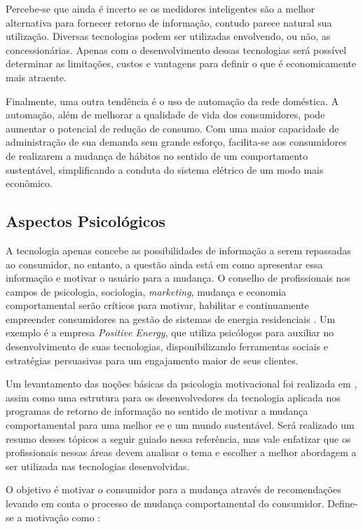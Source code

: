 Percebe-se que ainda é incerto se os medidores inteligentes são a melhor 
alternativa para fornecer retorno de informação, contudo parece natural sua 
utilização. Diversas tecnologias podem ser utilizadas envolvendo, ou não, as 
concessionárias. Apenas com o desenvolvimento dessas tecnologias será
possível determinar as limitações, custos e vantagens para definir o que é 
economicamente mais atraente.

Finalmente, uma outra tendência é o uso de automação da rede doméstica. A
automação, além de melhorar a qualidade de vida dos consumidores, pode aumentar
o potencial de redução de consumo. Com uma maior capacidade de administração de
sua demanda sem grande esforço, facilita-se aos consumidores de realizarem a
mudança de hábitos no sentido de um comportamento sustentável, simplificando
a conduta do sistema elétrico de um modo mais econômico.

\subsection{Aspectos Psicológicos}
\label{ssec:asp_psic}

A tecnologia apenas concebe as possibilidades de informação a
serem repassadas ao consumidor, no entanto, a questão ainda está em como
apresentar essa informação e motivar o usuário para a mudança. 
O conselho de profissionais nos campos de psicologia, sociologia,
\emph{marketing}, mudança e economia comportamental serão críticos para
motivar, habilitar e continuamente empreender consumidores na gestão de sistemas 
de energia residenciais \cite{aceee_2010_estudos_feedback}. 
Um exemplo é a empresa \emph{Positive Energy}, que utiliza psicólogos para
auxiliar no desenvolvimento de suas tecnologias, disponibilizando ferramentas
sociais e estratégias persuasivas para um engajamento maior de seus clientes.

Um levantamento das noções básicas da psicologia motivacional foi realizada em
\cite{2010_aspectos_psicologicos_usa}, assim como uma estrutura para os desenvolvedores 
da tecnologia aplicada nos programas de retorno de informação no sentido de motivar a 
mudança comportamental para uma melhor \gls{ee} e um mundo sustentável.
Será realizado um resumo desses tópicos a seguir guiado nessa referência, mas
vale enfatizar que os profissionais nessas áreas devem analisar o tema e
escolher a melhor abordagem a ser utilizada nas tecnologias desenvolvidas.

O objetivo é motivar o consumidor para a mudança através 
de recomendações levando em conta o processo de mudança comportamental 
do consumidor. Define-se a motivação como 
\cite[pp. 927-928, tradução própria]{2010_aspectos_psicologicos_usa}:


